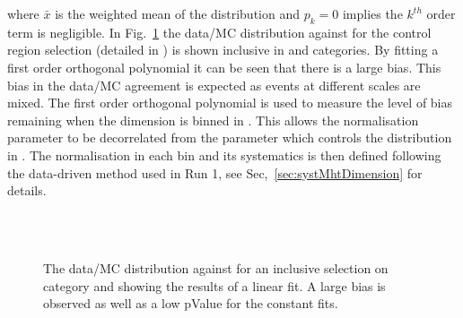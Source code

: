where $\bar{x}$ is the weighted mean of the distribution and $p_k = 0$ 
implies the $k^{th}$ order term is negligible.
In Fig.~\ref{fig:linearMotiv} the data/MC 
distribution against \mht for the control region selection 
(detailed in \cite{Khachatryan:2016pxa}) is shown inclusive 
in \scalht and categories. By fitting a first order
orthogonal polynomial it can be seen that there is a large bias. 
This bias in the data/MC agreement is expected as events 
at different scales are mixed.
The first order orthogonal polynomial
is used to measure the level of bias remaining 
when the \mht dimension is binned in \scalht.
This allows the normalisation parameter to be
decorrelated from the parameter which controls
the distribution in \mht.
The normalisation in each \scalht bin and its systematics 
is then defined following the data-driven method used in Run 1, see Sec,~\ref{sec:systMhtDimension} for details.
\begin{figure}[h!]
  \centering
  ~~
  \\
  \\
  \caption{\label{fig:linearMotiv} 
  The data/MC distribution against \mht for an inclusive selection on category and \scalht
  showing the results of a linear fit. A large bias is observed as well as a low pValue for the constant fits. 
 }
\end{figure}

